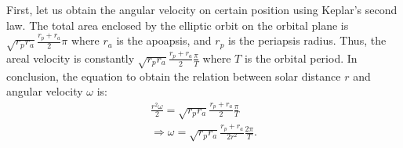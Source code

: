 First, let us obtain the angular velocity on certain position using Keplar's second law.
The total area enclosed by the elliptic orbit on the orbital plane is $\sqrt{r_p r_a}\frac{r_p+r_a}{2}\pi$ where $r_a$ is the apoapsis, and $r_p$ is the periapsis radius. Thus, the areal velocity is constantly $\sqrt{r_p r_a}\frac{r_p+r_a}{2}\frac{\pi}{T}$ where $T$ is the orbital period. In conclusion, the equation to obtain the relation between solar distance $r$ and angular velocity $\omega$ is:
\begin{align}
\frac{r^2 \omega}{2} = \sqrt{r_p r_a}\frac{r_p+r_a}{2}\frac{\pi}{T}
\\\nonumber\Rightarrow \omega = \sqrt{r_p r_a}\frac{r_p+r_a}{2r^2}\frac{2\pi}{T}.
\end{align}


\fi






